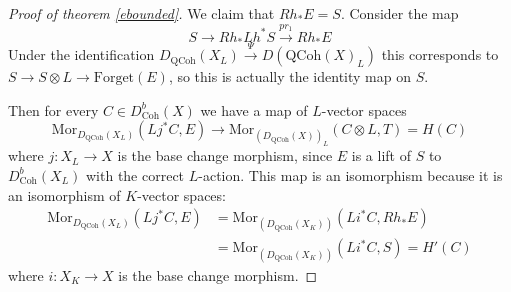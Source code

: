 \documentclass{amsart}
\begin{document}
\begin{proof}[Proof of theorem \ref{ebounded}]
We claim that $Rh_{*}E=S$. Consider the map
$$S \rightarrow Rh_{*}Lh^{*} S\xrightarrow{pr_{1}} Rh_{*}E$$
Under the identification $D_{\mathrm{QCoh}}(X_{L}) \stackrel{\Psi}{\longrightarrow} D(\text{QCoh}(X)_{L})$ this corresponds to $S\rightarrow S\otimes L\rightarrow \text{Forget} (E)$, so this is actually the identity map on $S$.

Then for every $C\in D^{b}_{\mathrm{Coh}}(X)$ we have a map of $L$-vector spaces
$$\text{Mor}_{D_{\mathrm{QCoh}}(X_{L})} (Lj^{*}C,E)\rightarrow \text{Mor}_{(D_{\mathrm{QCoh}}(X))_{L}}(C\otimes L,T)=H(C)$$
where $j:X_{L}\to X$ is the base change morphism, since $E$ is a lift of $S$ to $D^{b}_{\mathrm{Coh}}(X_{L})$ with the correct $L$-action. This map is an isomorphism because it is an isomorphism of $K$-vector spaces:
\begin{align*}
\text{Mor}_{D_{\mathrm{QCoh}}(X_{L})} (Lj^{*}C,E) &=\text{Mor}_{(D_{\mathrm{QCoh}}(X_{K}))}(Li^{*}C,Rh_{*}E) \\
&=\text{Mor}_{(D_{\mathrm{QCoh}}(X_{K}))}(Li^{*}C,S)=H'(C)
\end{align*}
where $i:X_{K}\to X$ is the base change morphism.
\end{proof}
\end{document}
